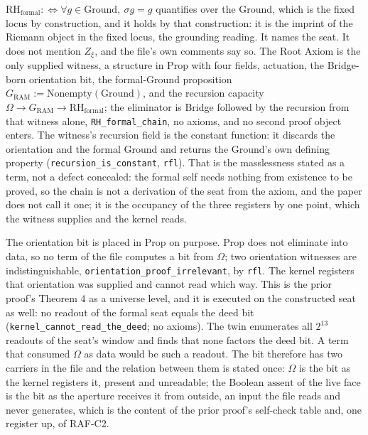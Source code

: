 \documentclass[10pt]{article}
\begin{document}
\(\mathrm{RH}_{\mathrm{formal}} :\Leftrightarrow \forall g \in \mathrm{Ground},\ \sigma g = g\)
quantifies over the Ground, which is the fixed locus by construction,
and it holds by that construction: it is the imprint of the Riemann
object in the fixed locus, the grounding reading. It names the seat. It
does not mention \(Z_\xi\), and the file's own comments say so. The Root
Axiom is the only supplied witness, a structure in Prop with four
fields, actuation, the Bridge-born orientation bit, the formal-Ground
proposition \(G_{\mathrm{RAM}} := \mathrm{Nonempty}(\mathrm{Ground})\),
and the recursion capacity
\(\Omega \to G_{\mathrm{RAM}} \to \mathrm{RH}_{\mathrm{formal}}\); the
eliminator is Bridge followed by the recursion from that witness alone,
\texttt{RH\_\allowbreak formal\_\allowbreak chain}, no axioms, and no
second proof object enters. The witness's recursion field is the
constant function: it discards the orientation and the formal Ground and
returns the Ground's own defining property
(\texttt{recursion\_\allowbreak is\_\allowbreak constant},
\texttt{rfl}). That is the masslessness stated as a term, not a defect
concealed: the formal self needs nothing from existence to be proved, so
the chain is not a derivation of the seat from the axiom, and the paper
does not call it one; it is the occupancy of the three registers by one
point, which the witness supplies and the kernel reads.

The orientation bit is placed in Prop on purpose. Prop does not
eliminate into data, so no term of the file computes a bit from
\(\Omega\); two orientation witnesses are indistinguishable,
\texttt{orientation\_\allowbreak proof\_\allowbreak irrelevant}, by
\texttt{rfl}. The kernel registers that orientation was supplied and
cannot read which way. This is the prior proof's Theorem 4 as a universe
level, and it is executed on the constructed seat as well: no readout of
the formal seat equals the deed bit
(\texttt{kernel\_\allowbreak cannot\_\allowbreak read\_\allowbreak the\_\allowbreak deed};
no axioms). The twin enumerates all \(2^{13}\) readouts of the seat's
window and finds that none factors the deed bit. A term that consumed
\(\Omega\) as data would be such a readout. The bit therefore has two
carriers in the file and the relation between them is stated once:
\(\Omega\) is the bit as the kernel registers it, present and
unreadable; the Boolean \(\mathrm{assent}\) of the live face is the bit
as the aperture receives it from outside, an input the file reads and
never generates, which is the content of the prior proof's self-check
table and, one register up, of RAF-C2.
\end{document}
